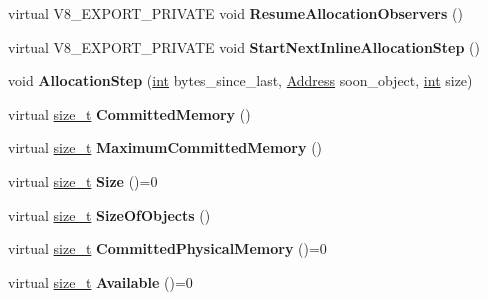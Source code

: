 \begin{DoxyCompactItemize}
virtual V8\+\_\+\+E\+X\+P\+O\+R\+T\+\_\+\+P\+R\+I\+V\+A\+TE void {\bfseries Resume\+Allocation\+Observers} ()
\item 
\mbox{\label{classv8_1_1internal_1_1Space_acbe0e528471ff37d13f089d27d9cad09}} 
virtual V8\+\_\+\+E\+X\+P\+O\+R\+T\+\_\+\+P\+R\+I\+V\+A\+TE void {\bfseries Start\+Next\+Inline\+Allocation\+Step} ()
\item 
\mbox{\label{classv8_1_1internal_1_1Space_a5dd08babbd0d3582b20912f0f35a5e40}} 
void {\bfseries Allocation\+Step} (\mbox{\hyperlink{classint}{int}} bytes\+\_\+since\+\_\+last, \mbox{\hyperlink{classuintptr__t}{Address}} soon\+\_\+object, \mbox{\hyperlink{classint}{int}} size)
\item 
\mbox{\label{classv8_1_1internal_1_1Space_a88c8357e28b6d087207d8cc5c10adb77}} 
virtual \mbox{\hyperlink{classsize__t}{size\+\_\+t}} {\bfseries Committed\+Memory} ()
\item 
\mbox{\label{classv8_1_1internal_1_1Space_a09844b089591b79c8916402ccdda86fa}} 
virtual \mbox{\hyperlink{classsize__t}{size\+\_\+t}} {\bfseries Maximum\+Committed\+Memory} ()
\item 
\mbox{\label{classv8_1_1internal_1_1Space_a5a16f0e8c8fd5bd4866be2a470cc8707}} 
virtual \mbox{\hyperlink{classsize__t}{size\+\_\+t}} {\bfseries Size} ()=0
\item 
\mbox{\label{classv8_1_1internal_1_1Space_a3ab8aba4950b0557ea65f7de08d7d99b}} 
virtual \mbox{\hyperlink{classsize__t}{size\+\_\+t}} {\bfseries Size\+Of\+Objects} ()
\item 
\mbox{\label{classv8_1_1internal_1_1Space_aa1f4b42fba0c67f5dbf98230ac009b70}} 
virtual \mbox{\hyperlink{classsize__t}{size\+\_\+t}} {\bfseries Committed\+Physical\+Memory} ()=0
\item 
\mbox{\label{classv8_1_1internal_1_1Space_ad0db4cff5f0048a4e12c53d2bf595590}} 
virtual \mbox{\hyperlink{classsize__t}{size\+\_\+t}} {\bfseries Available} ()=0
\item 

\end{DoxyCompactItemize}
